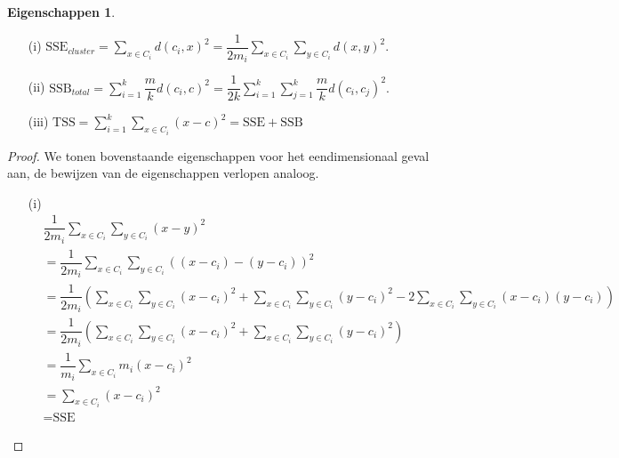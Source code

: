 \documentclass[a4paper,12pt]{article}
\theoremstyle{definition}
\newtheorem{eign}{Eigenschappen}[subsection]
\newcommand{\SSE}{\text{SSE}}
\newcommand{\CSSE}{\text{SSE}_{cluster}}
\newcommand{\SSB}{\text{SSB}}
\newcommand{\TSSB}{\text{SSB}_{total}}
\newcommand{\TSS}{\text{TSS}}
\begin{document}
\begin{eign}\ \\
 \label{eign}
 \begin{itemize}
  \item[(i)] $\CSSE =\sum\limits_{x\in C_i}d(c_i,x)^2 
  = \dfrac{1}{2m_i}\sum\limits_{x\in C_i}\sum\limits_{y\in C_i}d(x,y)^2.$
  \item[(ii)] $\TSSB = \sum\limits_{i=1}^k\dfrac{m}{k}d(c_i,c)^2 = 
  \dfrac{1}{2k}\sum\limits_{i=1}^k\sum\limits_{j=1}^k\dfrac{m}{k}d(c_i,c_j)^2.$
  \item[(iii)] $\TSS = \sum\limits_{i=1}^k\sum\limits_{x\in C_i}(x-c)^2=
  \SSE + \SSB$
 \end{itemize}
\end{eign}




\begin{proof}
We tonen bovenstaande eigenschappen voor het eendimensionaal geval aan,
de bewijzen van de eigenschappen verlopen analoog.
 \begin{itemize}

  \item[(i)]
  \begin{align*}
  &\dfrac{1}{2m_i}\sum\limits_{x\in C_i}\sum\limits_{y\in C_i}(x-y)^2\\
  &= \dfrac{1}{2m_i}\sum\limits_{x\in C_i}\sum\limits_{y\in C_i}((x-c_i) - (y-c_i))^2\\
  &= \dfrac{1}{2m_i}\left(\sum\limits_{x\in C_i}\sum\limits_{y\in C_i}(x-c_i)^2+\sum\limits_{x\in C_i}\sum\limits_{y\in C_i}(y-c_i)^2-2\sum\limits_{x\in C_i}\sum\limits_{y\in C_i}(x-c_i)(y-c_i)		  \right)\\
  &= \dfrac{1}{2m_i}\left(\sum\limits_{x\in C_i}\sum\limits_{y\in C_i}(x-c_i)^2+\sum\limits_{x\in C_i}\sum\limits_{y\in C_i}(y-c_i)^2\right)\\
  &= \dfrac{1}{m_i}\sum\limits_{x\in C_i}m_i(x-c_i)^2\\
  &= \sum\limits_{x\in C_i}(x-c_i)^2\\
  &= \SSE
  \end{align*}


\end{itemize}
\end{proof}
\end{document}
